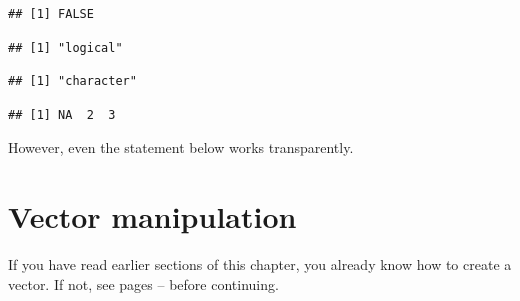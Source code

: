 \documentclass[krantz2]{krantz}\usepackage{knitr}
\begin{document}
\begin{explainbox}
\begin{knitrout}\footnotesize
{}\color{fgcolor}\begin{kframe}
\begin{alltt}
\hlstd{(}\hlstd{)}
\end{alltt}
\begin{verbatim}
## [1] FALSE
\end{verbatim}
\begin{alltt}
\hlstd{(}\hlstd{)}
\end{alltt}
\begin{verbatim}
## [1] "logical"
\end{verbatim}
\begin{alltt}
\hlstd{(}\hlstd{)}
\end{alltt}
\begin{verbatim}
## [1] "character"
\end{verbatim}
\end{kframe}
\end{knitrout}

\begin{knitrout}\footnotesize
{}\color{fgcolor}\begin{kframe}
\begin{alltt}
 \hlkwb{<-} 
 \hlopt{:}\hlstd{)}
\end{alltt}
\begin{verbatim}
## [1] NA  2  3
\end{verbatim}
\end{kframe}
\end{knitrout}

However, even the statement below works transparently.

\begin{knitrout}\footnotesize
{}\color{fgcolor}\begin{kframe}
\begin{alltt}
\hlstd{a[}\hlstd{]} \hlkwb{<-} \hlstd{b[}\hlstd{]}
\end{alltt}
\end{kframe}
\end{knitrout}
\end{explainbox}


\section{Vector manipulation}\label{sec:vectors}\label{sec:calc:indexing}
If you have read earlier sections of this chapter, you already know how to create a vector. If not, see pages \pageref{par:numeric:vectors:start}--\pageref{par:numeric:vectors:end} before continuing.
\end{document}
